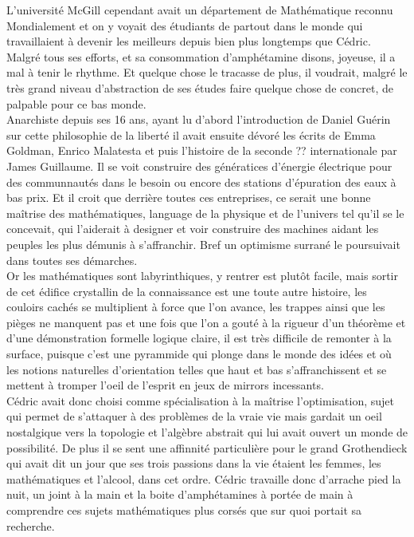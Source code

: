 \documentclass{article}
\begin{document}
L'université McGill cependant avait un département de Mathématique reconnu
Mondialement et on y voyait des étudiants de partout dans le monde qui
travaillaient à devenir les meilleurs depuis bien plus longtemps que Cédric.
Malgré tous ses efforts, et sa consommation d'amphétamine disons, joyeuse, il a
mal à tenir le rhythme. Et quelque chose le tracasse de plus, il voudrait,
malgré le très grand niveau d'abstraction de ses études faire quelque chose de
concret, de palpable pour ce bas monde.\\

Anarchiste depuis ses 16 ans, ayant lu d'abord l'introduction de Daniel Guérin
sur cette philosophie de la liberté il avait ensuite dévoré les écrits de Emma
Goldman, Enrico Malatesta et puis l'histoire de la seconde ?? internationale par
James Guillaume. Il se voit construire des génératices d'énergie électrique
pour des communnautés dans le besoin ou encore des stations d'épuration des eaux
à bas prix. Et il croit que derrière toutes ces entreprises, ce serait une
bonne maîtrise des mathématiques, language de la physique et de l'univers tel
qu'il se le concevait, qui l'aiderait à designer et voir construire des machines
aidant les peuples les plus démunis à s'affranchir. Bref un optimisme surrané le
poursuivait dans toutes ses démarches.\\

Or les mathématiques sont labyrinthiques, y rentrer est plutôt facile, mais sortir
de cet édifice crystallin de la connaissance est une toute autre histoire, les couloirs
cachés se multiplient à force que l'on avance, les trappes ainsi que les pièges
ne manquent pas et une fois que l'on a gouté à la rigueur d'un théorème et d'une
démonstration formelle logique claire, il est très difficile de remonter à la
surface, puisque c'est une pyrammide qui plonge dans le monde des idées et où
les notions naturelles d'orientation telles que haut et bas s'affranchissent et
se mettent à tromper l'oeil de l'esprit en jeux de mirrors incessants.\\


Cédric avait donc choisi comme spécialisation à la maîtrise l'optimisation,
sujet qui permet de s'attaquer à des problèmes de la vraie vie mais gardait un
oeil nostalgique vers la topologie et l'algèbre abstrait qui lui avait ouvert un
monde de possibilité. De plus il se sent une affinnité particulière pour le
grand Grothendieck qui avait dit un jour que ses trois passions dans la vie
étaient les femmes, les mathématiques et l'alcool, dans cet ordre. Cédric
travaille donc d'arrache pied la nuit, un joint à la main et la boite
d'amphétamines à portée de main à comprendre ces sujets mathématiques plus
corsés que sur quoi portait sa recherche. \\
\end{document}
